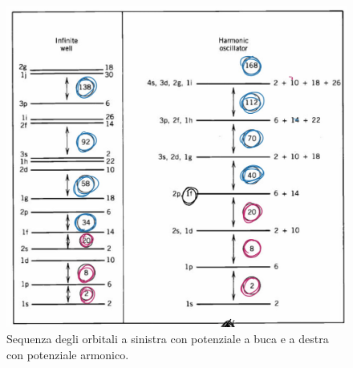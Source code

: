 \begin{figure}[h]
    \centering
    \includegraphics[scale=0.25]{Immagini/shell.png}
    \caption{Sequenza degli orbitali a sinistra con potenziale a buca e a destra con potenziale armonico.}
    \label{shell}
\end{figure}


